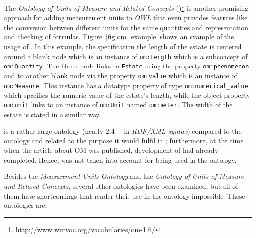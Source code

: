 The \emph{Ontology of Units of Measure and Related Concepts} ()\footnote{\href{http://www.wurvoc.org/vocabularies/om-1.6/}{http://www.wurvoc.org/vocabularies/om-1.6/}}\cite{OM} is another promising approach for adding measurement units to \emph{OWL} that even provides features like the conversion between different units for the same quantities and representation and checking of formulas. Figure~\ref{fig:om_example} shows an example of the usage of . In this example, the specification the length of the estate is centered around a blank node which is an instance of \texttt{om:Length} which is a subconcept of \texttt{om:Quantity}. The blank node links to \texttt{Estate} using the property \texttt{om:phenomenon} and to another blank node via the property \texttt{om:value} which is an instance of \texttt{om:Measure}. This instance has a datatype property of type \texttt{om:numerical\_value} which specifies the numeric value of the estate's length, while the object property \texttt{om:unit} links to an instance of \texttt{om:Unit} named \texttt{om:meter}. The width of the estate is stated in a similar way.

 is a rather large ontology (nearly \SI{2.4}{\mebi\byte} in \emph{RDF/XML syntax}) compared to the \thinkhomeweather ontology and related to the purpose it would fulfil in \thinkhomeweather; furthermore, at the time when the article about OM was published, development of \thinkhomeweather had already completed. Hence,  was not taken into account for being used in the \thinkhomeweather ontology.

Besides the \emph{Measurement Units Ontology} and the \emph{Ontology of Units of Measure and Related Concepts}, several other ontologies have been examined, but all of them have shortcomings that render their use in the \thinkhomeweather ontology impossible. These ontologies are:

